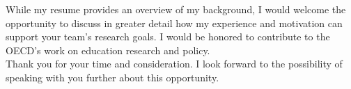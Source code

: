 \documentclass[11pt,a4paper,roman]{moderncv}
\begin{document}
\vspace{1em}
While my resume provides an overview of my background, I would welcome the opportunity to discuss in greater detail how my experience and motivation can support your team's research goals. I would be honored to contribute to the OECD's work on education research and policy.\\

\vspace{1em}
Thank you for your time and consideration. I look forward to the possibility of speaking with you further about this opportunity.

\vspace{0.5cm}


\makeletterclosing
\end{document}
